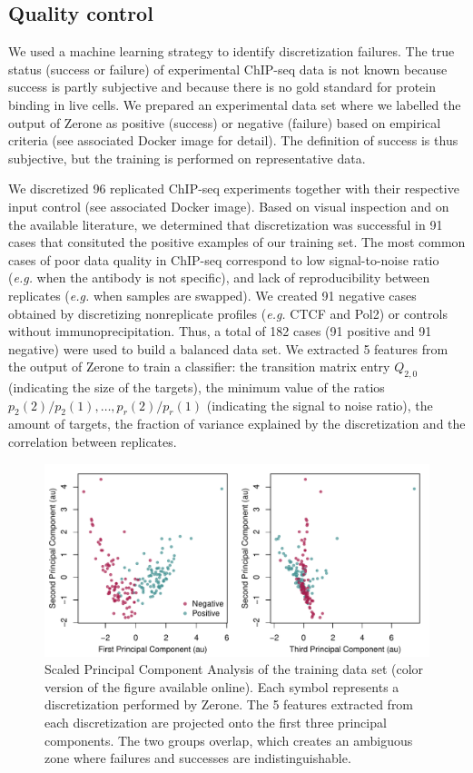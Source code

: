 \documentclass{bioinfo}
\begin{document}
\begin{methods}
\subsection{Quality control}
\label{sub:training}
We used a machine learning strategy to identify discretization
failures. The true status (success or failure) of experimental ChIP-seq
data is not known because success is partly subjective and because
there is no gold standard for protein binding in live cells.
We prepared an experimental data set where we labelled the
output of Zerone as positive (success) or negative (failure) based
on empirical criteria (see associated Docker image for detail).
The definition of success is thus subjective, but the training is
performed on representative data.

We discretized 96 replicated ChIP-seq experiments together with their
respective input control (see associated Docker image). Based on
visual inspection and on the available literature, we determined
that discretization was successful in 91 cases that consituted the
positive examples of our training set. The most common cases of
poor data quality in ChIP-seq correspond to low signal-to-noise ratio
(\textit{e.g.} when the antibody is not specific), and lack of
reproducibility between replicates (\textit{e.g.} when samples are
swapped). We created 91 negative cases obtained by discretizing
nonreplicate profiles (\textit{e.g.} CTCF and Pol2) or controls without
immunoprecipitation. Thus, a total of 182 cases (91 positive and 91
negative) were used to build a balanced data set. We extracted 5
features from the output of Zerone to train a classifier:
the transition matrix entry $Q_{2,0}$ (indicating the size of the
targets), the minimum value of the ratios
$p_2(2)/p_2(1), \ldots, p_r(2)/p_r(1)$ (indicating the
signal to noise ratio), the amount of targets, the fraction of
variance explained by the discretization and the correlation between
replicates.


\begin{figure}[!tpb]
\centerline{\includegraphics[scale=0.45]{PCA.pdf}}
\caption{
  Scaled Principal Component Analysis of the training data set
  (color version of the figure available online).
  Each symbol represents a discretization performed by Zerone. The
  5 features extracted from each discretization are projected onto
  the first three principal components. The two groups overlap,
  which creates an ambiguous zone where failures and successes are
  indistinguishable.
}\label{fig:pca}
\end{figure}



\end{methods}
\end{document}
